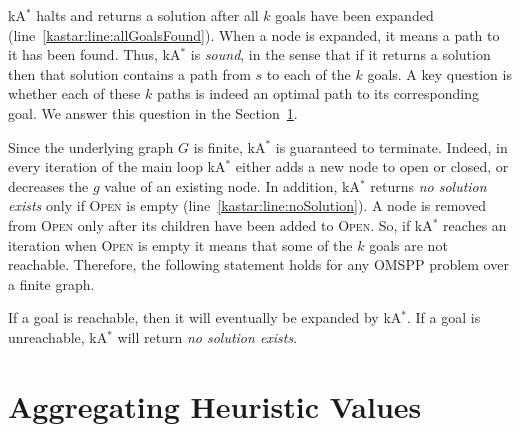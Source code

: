 \documentclass[smallextended]{svjour3}       %
\newcommand{\omspp}{\ac{OMSPP}\xspace}
\newcommand{\kastar}{kA$^*$\xspace}
\newcommand{\open}{\textsc{Open}\xspace}
\newcommand{\roni}[1]{\textbf{[RS:#1]}}
\begin{document}
\kastar halts and returns a solution after all $k$ goals have been expanded (line~\ref{kastar:line:allGoalsFound}).
When a node is expanded, it means a path to it has been found.
Thus, \kastar is \emph{sound}, in the sense that if it returns a solution then that solution contains a path from $s$ to each of the $k$ goals. 
A key question is whether each of these $k$ paths is indeed an optimal path to its corresponding goal. 
We answer this question in the Section~\ref{sec:aggregating}. 

Since the underlying graph $G$ is finite, \kastar is guaranteed to terminate. 
Indeed, in every iteration of the main loop \kastar either adds a new node to open or closed, or decreases the $g$ value of an existing node.
In addition, \kastar returns \emph{no solution exists} only if \open is empty (line~\ref{kastar:line:noSolution}).
A node is removed from \open only after its children have been added to \open. 
So, if \kastar reaches an iteration when \open is empty it means that some of the $k$ goals are not reachable.
Therefore, the following statement holds for any \omspp problem over a finite graph. 
\begin{proposition}[Completeness]
  \label{prop:completeness}
  If a goal is reachable, then it will eventually be expanded by \kastar. If a goal is unreachable, \kastar will return \emph{no solution exists}. 
\end{proposition}








\section{Aggregating Heuristic Values}
\label{sec:aggregating}
\end{document}
